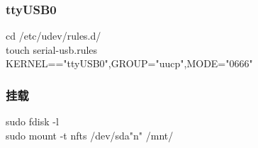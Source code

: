 \documentclass{beamer}
\newcommand{\quotes}[1]{"#1"}
\begin{document}
\begin{CJK}{UTF8}{gkai}
 \begin{frame}\frametitle{ttyUSB0}
   cd /etc/udev/rules.d/ \\
   touch serial-usb.rules\\
    KERNEL=="ttyUSB0",GROUP="uucp",MODE="0666"
 \end{frame}

 \begin{frame}\frametitle{挂载}
   sudo fdisk -l\\
   sudo mount -t nfts /dev/sda\quotes{n} /mnt/
 \end{frame}

\end{CJK}
\end{document}
